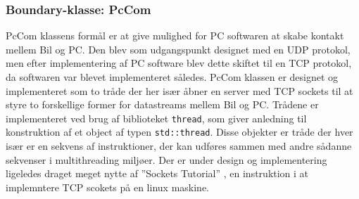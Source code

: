 \subsubsection{Boundary-klasse: PcCom} \label{sec:pccom}
PcCom klassens formål er at give mulighed for PC softwaren at skabe kontakt mellem Bil og PC. Den blev som udgangspunkt designet med en UDP protokol, men efter implementering af PC software blev dette skiftet til en TCP protokol, da softwaren var blevet implementeret således. PcCom klassen er designet og implementeret som to tråde der her især åbner en server med TCP sockets til at styre to forskellige former for datastreams mellem Bil og PC. Trådene er implementeret ved brug af biblioteket \texttt{thread}, som giver anledning til konstruktion af et object af typen \texttt{std::thread}. Disse objekter er tråde der hver især er en sekvens af instruktioner, der kan udføres sammen med andre sådanne sekvenser i multithreading miljøer. Der er under design og implementering ligeledes draget meget nytte af ''Sockets Tutorial'' \cite{lib:socket_tutorial}, en instruktion i at implemntere TCP scokets på en linux maskine.